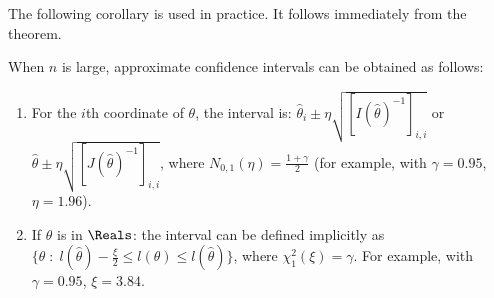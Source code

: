 The following corollary is used in practice. It follows
immediately from the theorem.
\begin{corollary} When $n$
is large, approximate confidence intervals can be obtained as
follows:\begin{enumerate}
    \item For the $i$th coordinate of $\theta$, the interval is: $\hat{\theta}_i \pm \eta \sqrt{\left[I(\hat{\theta})^{-1}\right]_{i,i}}$ or
     $\hat{\theta} \pm \eta \sqrt{\left[J(\hat{\theta})^{-1}\right]_{i,i}}$, where
    $N_{0,1}(\eta)=\frac{1+\gamma}{2}$ (for example, with $\gamma=0.95$,
$\eta=1.96$).
    \item If $\theta$ is in $\Reals$: the interval can be defined implicitly as $\{\theta\; : \; l(\hat{\theta})- \frac{\xi}{2} \leq l(\theta) \leq   l(\hat{\theta}) \}$,
    where $\chi^2_1( \xi)= \gamma$. For example, with $\gamma=0.95$, $\xi=3.84$.
\end{enumerate}
\end{corollary}

